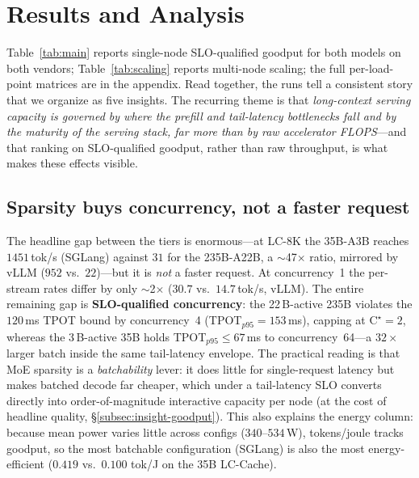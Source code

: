 
\section{Results and Analysis}
\label{sec:results}

Table~\ref{tab:main} reports single-node SLO-qualified goodput for both models on
both vendors; Table~\ref{tab:scaling} reports multi-node scaling; the full
per-load-point matrices are in the appendix. Read together, the runs tell a
consistent story that we organize as five insights. The recurring theme is that
\emph{long-context serving capacity is governed by where the prefill and
tail-latency bottlenecks fall and by the maturity of the serving stack, far more
than by raw accelerator FLOPS}---and that ranking on SLO-qualified goodput, rather
than raw throughput, is what makes these effects visible.

\subsection{Sparsity buys concurrency, not a faster request}
\label{subsec:insight-concurrency}
The headline gap between the tiers is enormous---at LC-8K the 35B-A3B reaches
$1451$\,tok/s (SGLang) against $31$ for the 235B-A22B, a $\sim$47$\times$ ratio,
mirrored by vLLM ($952$ vs.\ $22$)---but it is \emph{not} a faster request. At
concurrency~1 the per-stream rates differ by only $\sim$2$\times$ ($30.7$ vs.\
$14.7$\,tok/s, vLLM). The entire remaining gap is \textbf{SLO-qualified
concurrency}: the 22\,B-active 235B violates the $120$\,ms TPOT bound by
concurrency~4 (TPOT$_{p95}{=}153$\,ms), capping at $\text{C}^\star{=}2$, whereas
the 3\,B-active 35B holds TPOT$_{p95}\!\leq\!67$\,ms to concurrency~64---a
$32\times$ larger batch inside the same tail-latency envelope. The practical
reading is that MoE sparsity is a \emph{batchability} lever: it does little for
single-request latency but makes batched decode far cheaper, which under a
tail-latency SLO converts directly into order-of-magnitude interactive capacity
per node (at the cost of headline quality, \S\ref{subsec:insight-goodput}). This
also explains the energy column: because mean power varies little across configs
($340$--$534$\,W), tokens/joule tracks goodput, so the most batchable
configuration (SGLang) is also the most energy-efficient ($0.419$ vs.\ $0.100$
tok/J on the 35B LC-Cache).

